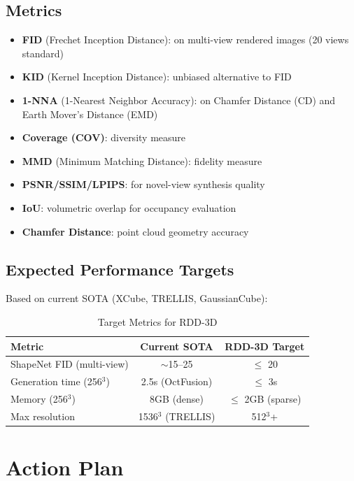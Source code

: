 \documentclass[11pt, a4paper]{article}
\begin{document}
\subsection{Metrics}

\begin{itemize}
    \item \textbf{FID} (Frechet Inception Distance): on multi-view rendered images (20 views standard)
    \item \textbf{KID} (Kernel Inception Distance): unbiased alternative to FID
    \item \textbf{1-NNA} (1-Nearest Neighbor Accuracy): on Chamfer Distance (CD) and Earth Mover's Distance (EMD)
    \item \textbf{Coverage (COV)}: diversity measure
    \item \textbf{MMD} (Minimum Matching Distance): fidelity measure
    \item \textbf{PSNR/SSIM/LPIPS}: for novel-view synthesis quality
    \item \textbf{IoU}: volumetric overlap for occupancy evaluation
    \item \textbf{Chamfer Distance}: point cloud geometry accuracy
\end{itemize}

\subsection{Expected Performance Targets}

Based on current SOTA (XCube, TRELLIS, GaussianCube):

\begin{table}[H]
\centering
\caption{Target Metrics for RDD-3D}
\begin{tabular}{lcc}
\toprule
Metric & Current SOTA & RDD-3D Target \\
\midrule
ShapeNet FID (multi-view) & $\sim$15--25 & $\leq$ 20 \\
Generation time (256$^3$) & 2.5s (OctFusion) & $\leq$ 3s \\
Memory (256$^3$) & 8GB (dense) & $\leq$ 2GB (sparse) \\
Max resolution & 1536$^3$ (TRELLIS) & 512$^3$+ \\
\bottomrule
\end{tabular}
\end{table}

\section{Action Plan}
\end{document}
